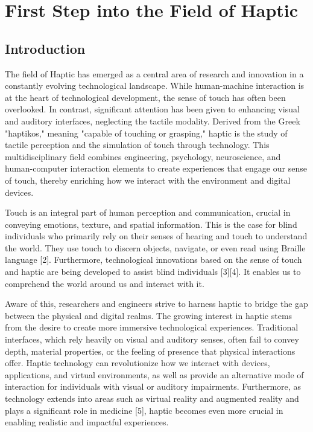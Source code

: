 \chapter{First Step into the Field of Haptic}
\section{Introduction}
The field of Haptic has emerged as a central area of research and innovation in a constantly evolving technological landscape. While human-machine interaction is at the heart of technological development, the sense of touch has often been overlooked. In contrast, significant attention has been given to enhancing visual and auditory interfaces, neglecting the tactile modality. Derived from the Greek "haptikos," meaning "capable of touching or grasping," haptic is the study of tactile perception and the simulation of touch through technology. This multidisciplinary field combines engineering, psychology, neuroscience, and human-computer interaction elements to create experiences that engage our sense of touch, thereby enriching how we interact with the environment and digital devices.

Touch is an integral part of human perception and communication, crucial in conveying emotions, texture, and spatial information. This is the case for blind individuals who primarily rely on their senses of hearing and touch to understand the world. They use touch to discern objects, navigate, or even read using Braille language [2]. Furthermore, technological innovations based on the sense of touch and haptic are being developed to assist blind individuals [3][4]. It enables us to comprehend the world around us and interact with it.

Aware of this, researchers and engineers strive to harness haptic to bridge the gap between the physical and digital realms.
The growing interest in haptic stems from the desire to create more immersive technological experiences. Traditional interfaces, which rely heavily on visual and auditory senses, often fail to convey depth, material properties, or the feeling of presence that physical interactions offer. Haptic technology can revolutionize how we interact with devices, applications, and virtual environments, as well as provide an alternative mode of interaction for individuals with visual or auditory impairments. Furthermore, as technology extends into areas such as virtual reality and augmented reality and plays a significant role in medicine [5], haptic becomes even more crucial in enabling realistic and impactful experiences.

